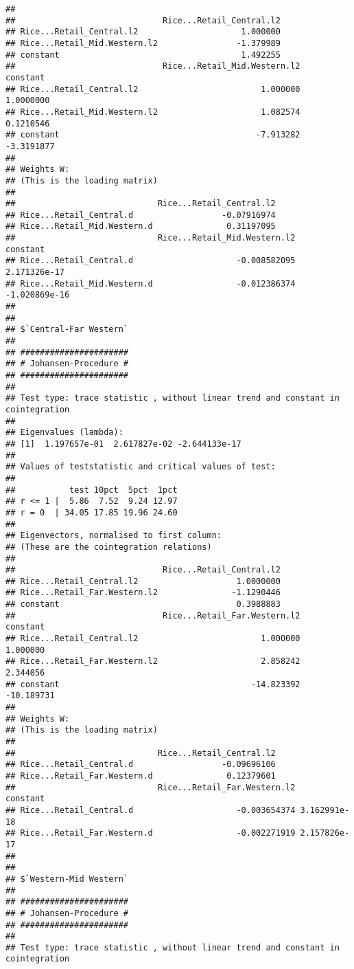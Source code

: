 \documentclass[12pt,]{article}
\begin{document}
\begin{verbatim}
## 
##                              Rice...Retail_Central.l2
## Rice...Retail_Central.l2                     1.000000
## Rice...Retail_Mid.Western.l2                -1.379989
## constant                                     1.492255
##                              Rice...Retail_Mid.Western.l2   constant
## Rice...Retail_Central.l2                         1.000000  1.0000000
## Rice...Retail_Mid.Western.l2                     1.082574  0.1210546
## constant                                        -7.913282 -3.3191877
## 
## Weights W:
## (This is the loading matrix)
## 
##                             Rice...Retail_Central.l2
## Rice...Retail_Central.d                  -0.07916974
## Rice...Retail_Mid.Western.d               0.31197095
##                             Rice...Retail_Mid.Western.l2      constant
## Rice...Retail_Central.d                     -0.008582095  2.171326e-17
## Rice...Retail_Mid.Western.d                 -0.012386374 -1.020869e-16
## 
## 
## $`Central-Far Western`
## 
## ###################### 
## # Johansen-Procedure # 
## ###################### 
## 
## Test type: trace statistic , without linear trend and constant in cointegration 
## 
## Eigenvalues (lambda):
## [1]  1.197657e-01  2.617827e-02 -2.644133e-17
## 
## Values of teststatistic and critical values of test:
## 
##           test 10pct  5pct  1pct
## r <= 1 |  5.86  7.52  9.24 12.97
## r = 0  | 34.05 17.85 19.96 24.60
## 
## Eigenvectors, normalised to first column:
## (These are the cointegration relations)
## 
##                              Rice...Retail_Central.l2
## Rice...Retail_Central.l2                    1.0000000
## Rice...Retail_Far.Western.l2               -1.1290446
## constant                                    0.3988883
##                              Rice...Retail_Far.Western.l2   constant
## Rice...Retail_Central.l2                         1.000000   1.000000
## Rice...Retail_Far.Western.l2                     2.858242   2.344056
## constant                                       -14.823392 -10.189731
## 
## Weights W:
## (This is the loading matrix)
## 
##                             Rice...Retail_Central.l2
## Rice...Retail_Central.d                  -0.09696106
## Rice...Retail_Far.Western.d               0.12379601
##                             Rice...Retail_Far.Western.l2     constant
## Rice...Retail_Central.d                     -0.003654374 3.162991e-18
## Rice...Retail_Far.Western.d                 -0.002271919 2.157826e-17
## 
## 
## $`Western-Mid Western`
## 
## ###################### 
## # Johansen-Procedure # 
## ###################### 
## 
## Test type: trace statistic , without linear trend and constant in cointegration 

\end{verbatim}
\end{document}

